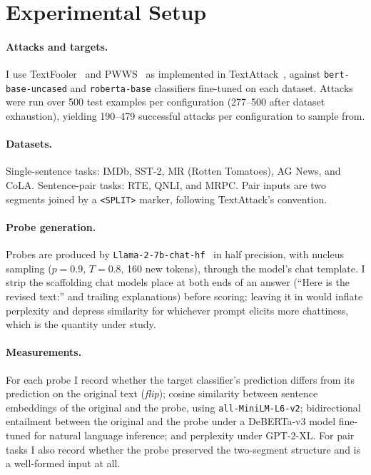 \documentclass[11pt]{article}
\begin{document}
\section{Experimental Setup}
\label{sec:setup}

\paragraph{Attacks and targets.}
I use TextFooler~\citep{jin2020bert} and PWWS~\citep{ren2019pwws} as implemented
in TextAttack~\citep{morris2020textattack}, against \texttt{bert-base-uncased}
and \texttt{roberta-base} classifiers fine-tuned on each dataset. Attacks were
run over 500 test examples per configuration (277--500 after dataset
exhaustion), yielding 190--479 successful attacks per configuration to sample
from.

\paragraph{Datasets.}
Single-sentence tasks: IMDb, SST-2, MR (Rotten Tomatoes), AG News, and CoLA.
Sentence-pair tasks: RTE, QNLI, and MRPC. Pair inputs are two segments joined by
a \texttt{<SPLIT>} marker, following TextAttack's convention.

\paragraph{Probe generation.}
Probes are produced by \texttt{Llama-2-7b-chat-hf}~\citep{touvron2023llama} in
half precision, with nucleus sampling ($p=0.9$, $T=0.8$, 160 new tokens),
through the model's chat template. I strip the scaffolding chat models place at
both ends of an answer (``Here is the revised text:'' and trailing explanations)
before scoring; leaving it in would inflate perplexity and depress similarity for
whichever prompt elicits more chattiness, which is the quantity under study.

\paragraph{Measurements.}
For each probe I record whether the target classifier's prediction differs from
its prediction on the original text (\emph{flip}); cosine similarity between
sentence embeddings of the original and the probe, using
\texttt{all-MiniLM-L6-v2}; bidirectional entailment between the original and the
probe under a DeBERTa-v3 model fine-tuned for natural language inference; and
perplexity under GPT-2-XL. For pair tasks I also record whether the probe
preserved the two-segment structure and is a well-formed input at all.
\end{document}
